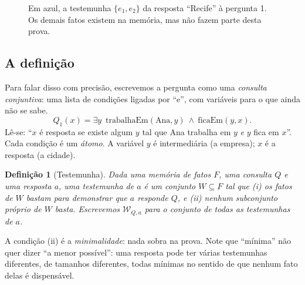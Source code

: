 \documentclass[11pt]{article}
\newtheorem{definicao}{Definição}
\begin{document}
\begin{figure}[h]
\centering
{}
\caption{Em azul, a testemunha $\{e_1,e_2\}$ da resposta ``Recife'' à
pergunta 1. Os demais fatos existem na memória, mas não fazem parte desta
prova.}
\label{fig:testemunha}
\end{figure}

\subsection{A definição}

Para falar disso com precisão, escrevemos a pergunta como uma
\emph{consulta conjuntiva}: uma lista de condições ligadas por ``e'', com
variáveis para o que ainda não se sabe.
\[
Q_1(x)=\exists y\;\ \mathrm{trabalhaEm}(\text{Ana},y)\ \wedge\ \mathrm{ficaEm}(y,x).
\]
Lê-se: ``$x$ é resposta se existe algum $y$ tal que Ana trabalha em $y$
\emph{e} $y$ fica em $x$''. Cada condição é um \emph{átomo}. A variável $y$ é
intermediária (a empresa); $x$ é a resposta (a cidade).

\begin{definicao}[Testemunha]
Dada uma memória de fatos $F$, uma consulta $Q$ e uma resposta $a$, uma
testemunha de $a$ é um conjunto $W\subseteq F$ tal que
(i) os fatos de $W$ bastam para demonstrar que $a$ responde $Q$, e
(ii) nenhum subconjunto próprio de $W$ basta.
Escrevemos $\mathcal{W}_{Q,a}$ para o conjunto de todas as testemunhas de $a$.
\end{definicao}

A condição (ii) é a \emph{minimalidade}: nada sobra na prova. Note que
``mínima'' não quer dizer ``a menor possível'': uma resposta pode ter várias
testemunhas diferentes, de tamanhos diferentes, todas mínimas no sentido de
que nenhum fato delas é dispensável.
\end{document}
